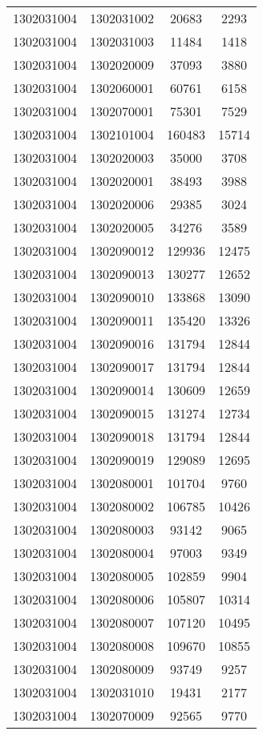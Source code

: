 \begin{longtable}[h]{llcc}
		1302031004 & 1302031002 & 20683 & 2293\\
		1302031004 & 1302031003 & 11484 & 1418\\
		1302031004 & 1302020009 & 37093 & 3880\\
		1302031004 & 1302060001 & 60761 & 6158\\
		1302031004 & 1302070001 & 75301 & 7529\\
		1302031004 & 1302101004 & 160483 & 15714\\
		1302031004 & 1302020003 & 35000 & 3708\\
		1302031004 & 1302020001 & 38493 & 3988\\
		1302031004 & 1302020006 & 29385 & 3024\\
		1302031004 & 1302020005 & 34276 & 3589\\
		1302031004 & 1302090012 & 129936 & 12475\\
		1302031004 & 1302090013 & 130277 & 12652\\
		1302031004 & 1302090010 & 133868 & 13090\\
		1302031004 & 1302090011 & 135420 & 13326\\
		1302031004 & 1302090016 & 131794 & 12844\\
		1302031004 & 1302090017 & 131794 & 12844\\
		1302031004 & 1302090014 & 130609 & 12659\\
		1302031004 & 1302090015 & 131274 & 12734\\
		1302031004 & 1302090018 & 131794 & 12844\\
		1302031004 & 1302090019 & 129089 & 12695\\
		1302031004 & 1302080001 & 101704 & 9760\\
		1302031004 & 1302080002 & 106785 & 10426\\
		1302031004 & 1302080003 & 93142 & 9065\\
		1302031004 & 1302080004 & 97003 & 9349\\
		1302031004 & 1302080005 & 102859 & 9904\\
		1302031004 & 1302080006 & 105807 & 10314\\
		1302031004 & 1302080007 & 107120 & 10495\\
		1302031004 & 1302080008 & 109670 & 10855\\
		1302031004 & 1302080009 & 93749 & 9257\\
		1302031004 & 1302031010 & 19431 & 2177\\
		1302031004 & 1302070009 & 92565 & 9770\\

\end{longtable}
